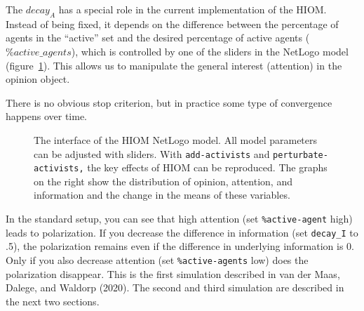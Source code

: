 \documentclass[
  a4paper,
  DIV=11,
  numbers=noendperiod,
  oneside]{scrreprt}
\begin{document}
The \({decay}_{A}\) has a special role in the current implementation of
the HIOM. Instead of being fixed, it depends on the difference between
the percentage of agents in the ``active'' set and the desired
percentage of active agents (\(\%active\_agents\)), which is controlled
by one of the sliders in the NetLogo model
(figure~\ref{fig-ch7-img10-old-98}). This allows us to manipulate the
general interest (attention) in the opinion object.

There is no obvious stop criterion, but in practice some type of
convergence happens over time.

\begin{figure}


\caption{\label{fig-ch7-img10-old-98}The interface of the HIOM NetLogo
model. All model parameters can be adjusted with sliders. With
\texttt{add-activists} and \texttt{perturbate-activists,} the key
effects of HIOM can be reproduced. The graphs on the right show the
distribution of opinion, attention, and information and the change in
the means of these variables.}

\end{figure}%

In the standard setup, you can see that high attention (set
\texttt{\%active-agent} high) leads to polarization. If you decrease the
difference in information (set \texttt{decay\_I} to .5), the
polarization remains even if the difference in underlying information is
0. Only if you also decrease attention (set \texttt{\%active-agents}
low) does the polarization disappear. This is the first simulation
described in van der Maas, Dalege, and Waldorp (2020). The second and
third simulation are described in the next two sections.
\end{document}
